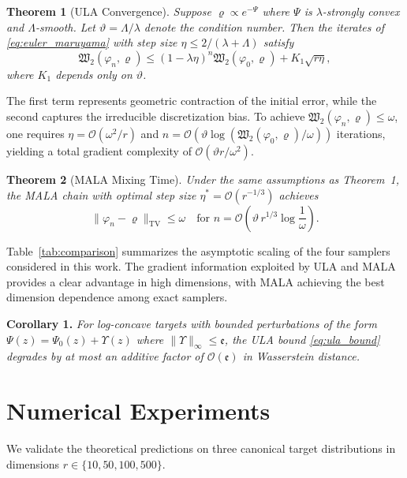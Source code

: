 \documentclass[journal]{IEEEtran}
\begin{document}
\textbf{Theorem 1} (ULA Convergence). \textit{Suppose $\varrho \propto e^{-\Psi}$ where $\Psi$ is $\lambda$-strongly convex and $\Lambda$-smooth. Let $\vartheta = \Lambda/\lambda$ denote the condition number. Then the iterates of \eqref{eq:euler_maruyama} with step size $\eta \leq 2/(\lambda+\Lambda)$ satisfy}
\begin{equation}\label{eq:ula_bound}
  \mathfrak{W}_2(\varphi_n, \varrho) \leq (1 - \lambda\eta)^n \mathfrak{W}_2(\varphi_0, \varrho) + K_1 \sqrt{r\eta},
\end{equation}
\textit{where $K_1$ depends only on $\vartheta$.}

The first term represents geometric contraction of the initial error, while the second captures the irreducible discretization bias. To achieve $\mathfrak{W}_2(\varphi_n, \varrho) \leq \omega$, one requires $\eta = \mathcal{O}(\omega^2/r)$ and $n = \mathcal{O}(\vartheta \log(\mathfrak{W}_2(\varphi_0,\varrho)/\omega))$ iterations, yielding a total gradient complexity of $\mathcal{O}(\vartheta r / \omega^2)$.

\textbf{Theorem 2} (MALA Mixing Time). \textit{Under the same assumptions as Theorem~1, the MALA chain with optimal step size $\eta^* = \mathcal{O}(r^{-1/3})$ achieves}
\begin{equation}\label{eq:mala_mixing}
  \|\varphi_n - \varrho\|_{\text{TV}} \leq \omega \quad \text{for } n = \mathcal{O}\!\left(\vartheta\, r^{1/3} \log\frac{1}{\omega}\right).
\end{equation}

Table~\ref{tab:comparison} summarizes the asymptotic scaling of the four samplers considered in this work. The gradient information exploited by ULA and MALA provides a clear advantage in high dimensions, with MALA achieving the best dimension dependence among exact samplers.

\textbf{Corollary 1.} \textit{For log-concave targets with bounded perturbations of the form $\Psi(z) = \Psi_0(z) + \Upsilon(z)$ where $\|\Upsilon\|_\infty \leq \mathfrak{e}$, the ULA bound \eqref{eq:ula_bound} degrades by at most an additive factor of $\mathcal{O}(\mathfrak{e})$ in Wasserstein distance.}

\section{Numerical Experiments}
\label{sec:numerical}

We validate the theoretical predictions on three canonical target distributions in dimensions $r \in \{10, 50, 100, 500\}$.
\end{document}
